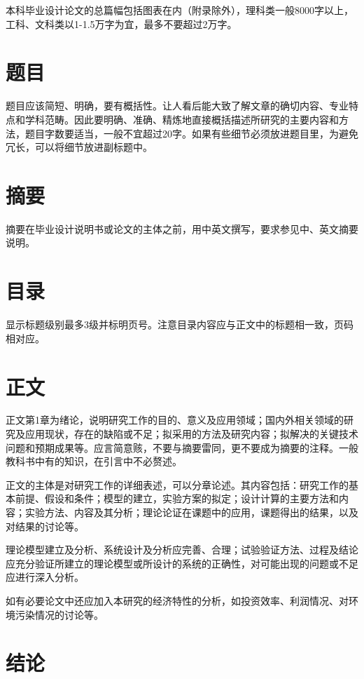 \documentclass[
	StudentName     = 姓名,
	StudentID       = 学号,
	AdvisorName     = 指导教师,
	Grade           = 年级,
	Major           = 专业,
	Department      = 一个很长很长的名字,
	SubmitYear		= 2022,
	SubmitMonth		= 5,
	Title           = 论文中文题目,
	TitleEng        = {{English Title}}
]{cauc_thesis}
\begin{document}
	
	本科毕业设计论文的总篇幅包括图表在内（附录除外），理科类一般8000字以上，工科、文科类以1-1.5万字为宜，最多不要超过2万字。
	
	\section{题目}
	
	题目应该简短、明确，要有概括性。让人看后能大致了解文章的确切内容、专业特点和学科范畴。因此要明确、准确、精炼地直接概括描述所研究的主要内容和方法，题目字数要适当，一般不宜超过20字。如果有些细节必须放进题目里，为避免冗长，可以将细节放进副标题中。
	
	\section{摘要}
	
	摘要在毕业设计说明书或论文的主体之前，用中英文撰写，要求参见中、英文摘要说明。
	
	\section{目录}
	
	显示标题级别最多3级并标明页号。注意目录内容应与正文中的标题相一致，页码相对应。
	
	\section{正文}
	
	正文第1章为绪论，说明研究工作的目的、意义及应用领域；国内外相关领域的研究及应用现状，存在的缺陷或不足；拟采用的方法及研究内容；拟解决的关键技术问题和预期成果等。应言简意赅，不要与摘要雷同，更不要成为摘要的注释。一般教科书中有的知识，在引言中不必赘述。
	
	正文的主体是对研究工作的详细表述，可以分章论述。其内容包括：研究工作的基本前提、假设和条件；模型的建立，实验方案的拟定；设计计算的主要方法和内容；实验方法、内容及其分析；理论论证在课题中的应用，课题得出的结果，以及对结果的讨论等。
	
	理论模型建立及分析、系统设计及分析应完善、合理；试验验证方法、过程及结论应充分验证所建立的理论模型或所设计的系统的正确性，对可能出现的问题或不足应进行深入分析。
	
	如有必要论文中还应加入本研究的经济特性的分析，如投资效率、利润情况、对环境污染情况的讨论等。
	
	\section{结论}
	
\end{document}
